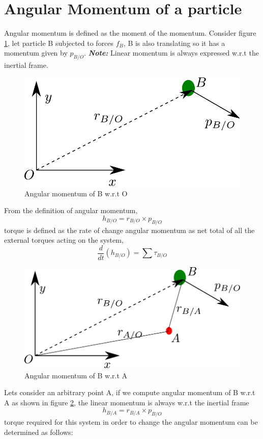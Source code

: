 \section{Angular Momentum of a particle}

Angular momentum is defined as the moment of the momentum. Consider figure \ref{fig_0_ch_0_anugularMomentumwrtO}, let particle B subjected to forces $f_{B}$, B is also translating so it has a momentum given by $p_{B/O}$. \textbf{\textit{Note: }}Linear momentum is always expressed w.r.t the inertial frame. 
\begin{figure}[h!]
	\centering
	\includegraphics[width=0.6\linewidth]{Bilder/11_AnularMomentumParticle.pdf}
	\caption{Angular momentum of B w.r.t O}
	\label{fig_0_ch_0_anugularMomentumwrtO}
\end{figure}
From the definition of angular momentum,
\begin{equation} \label{eq_0_ch_2_angualrMomentumofAParticle}
	h_{B/O} = r_{B/O} \times p_{B/O}
\end{equation}
torque is defined as the rate of change angular momentum as net total of all the external torques acting on the system,
\begin{equation}
	\frac{d}{dt}(h_{B/O}) = \sum \tau_{B/O}
\end{equation}
\begin{figure}[h!]
	\centering
	\includegraphics[width=0.6\linewidth]{Bilder/12_AnularMomentumParticle.pdf}
	\caption{Angular momentum of B w.r.t A}
	\label{fig_0_ch_0_anugularMomentumwrtB}
\end{figure}
Lets consider an arbitrary point A, if we compute angular momentum of B w.r.t A as shown in figure \ref{fig_0_ch_0_anugularMomentumwrtB}, the linear momentum is always w.r.t the inertial frame
\begin{equation}
	h_{B/A} = r_{B/A} \times p_{B/O}
\end{equation}
torque required for this system in order to change the angular momentum can be determined as follows:

